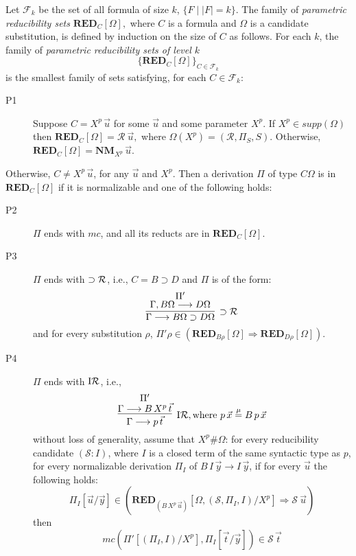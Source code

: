 \documentclass[preprint]{elsarticle}
\def\Fscr{{\mathcal F}}
\def\Rscr{{\mathcal R}}
\def\Sscr{{\mathcal S}}
\newcommand{\Seq}[2]{#1\longrightarrow #2}
\newcommand{\defmu}{\stackrel{\mu}{=}}
\newcommand{\indR}{{\rm I}{\cal R}}
\newcommand{\oimpR}{\oimp{\cal R}}
\newcommand{\oimp}{\supset}
\def\RED{{\mathbf{RED}}}
\def\NM{{\mathbf{NM}}}
\begin{document}
\begin{definition}
\label{def:param red} 
Let $\Fscr_k$ be the set of all formula of size $k$, \ie $ \{F \mid
|F| = k \} $.  The family of \emph{parametric reducibility sets}
$\RED_C[\Omega],$ where $C$ is a formula and $\Omega$ is a candidate
substitution, is defined by induction on the size of $C$ as follows.
For each $k$, the family of \emph{parametric reducibility sets of
  level $k$}
$$
\{\RED_C[\Omega] \}_{C \in \Fscr_k}
$$
is the smallest family of sets satisfying, 
for each $C \in \Fscr_k$:
\begin{description}
\item[P1] Suppose $C = X^p\,\vec u$ for some $\vec u$ and some parameter $X^p$. 
If $X^p \in supp(\Omega)$ then 
$\RED_C[\Omega] = \Rscr~\vec u,$ where $\Omega(X^p) = (\Rscr, \Pi_S, S)$. 
Otherwise, $\RED_C[\Omega] = \NM_{X^p}\,\vec u$. 
\end{description}

Otherwise, $C \not = X^p\,\vec u$, for any $\vec u$ and  $X^p$. 
Then a derivation $\Pi$ of type $C\Omega$ is in
$\RED_C[\Omega]$ if it is normalizable and one of the following holds:
\begin{description}
\item[P2] $\Pi$ ends with $mc$, and all its reducts are in
      $\RED_C[\Omega]$.
\item[P3] $\Pi$ ends with $\oimpR$, i.e., $C = B \oimp D$ and $\Pi$ is
  of the form: 
    $$
    \infer[\oimpR] 
          {\Seq \Gamma {B\Omega \oimp D\Omega}} 
          {\deduce{\Seq{\Gamma, B\Omega}{D\Omega}}{\Pi'} }
    $$
    and for every substitution $\rho$, $\Pi'\rho \in
    (\RED_{B\rho}[\Omega] \Rightarrow \RED_{D\rho}[\Omega])$.
    
\item[P4] $\Pi$ ends with $\indR$, i.e., 
    $$
    \infer[\indR, \hbox{where $p\,\vec x \defmu B\,p\,\vec x$}]
    {\Seq \Gamma {p\,\vec t} }
    {\deduce{\Seq \Gamma {B\,X^p\,\vec t}}{\Pi'}}
    $$
    without loss of generality, assume that $X^p \# \Omega$: for
    every reducibility candidate $(\Sscr : I)$, where $I$ is a closed
    term of the same syntactic type as $p$, for every normalizable
    derivation $\Pi_I$ of $\Seq {B\,I\,\vec y} {I\,\vec y}$, if for
    every $\vec u$ the following holds:
    $$
    \Pi_I[\vec u/ \vec y] \in (\RED_{(B\,X^p\,\vec u)}[\Omega, (\Sscr,
    \Pi_I, I)/X^p] \Rightarrow \Sscr~\vec u) 
    $$
    then 
    $$mc(\Pi'[(\Pi_I,I)/X^p], \Pi_I[\vec t/\vec y])  \in \Sscr\,\vec t$$


\end{description}
\end{definition}
\end{document}
